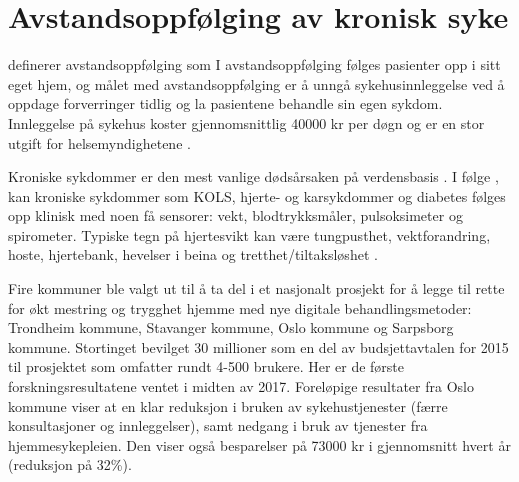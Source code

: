 \section{Avstandsoppfølging av kronisk syke}
\label{sec:remotemonitoring}
\citet{rojahn2016remote} definerer avstandsoppfølging som 
I avstandsoppfølging følges pasienter opp i sitt eget hjem, og
målet med avstandsoppfølging er å unngå sykehusinnleggelse ved å oppdage forverringer tidlig og la
pasientene behandle sin egen sykdom. Innleggelse på sykehus koster gjennomsnittlig 40000 kr per døgn og er en stor utgift
for helsemyndighetene \citep{regjeringen_innleggelse}.

Kroniske sykdommer er den mest vanlige dødsårsaken på verdensbasis \citep{who_chronic}.
I følge \citet{austad2016sensorer}, kan kroniske sykdommer som KOLS, hjerte- og karsykdommer og diabetes
følges opp klinisk med noen få sensorer: vekt, blodtrykksmåler, pulsoksimeter og spirometer. Typiske
tegn på hjertesvikt kan være tungpusthet, vektforandring, hoste, hjertebank, hevelser i beina og
tretthet/tiltaksløshet \citep{ehelse_hjertesvikt} \citep{nasjonalforeningen}.

Fire kommuner ble valgt ut til å ta del i et nasjonalt prosjekt for å legge til rette for økt mestring
og trygghet hjemme med nye digitale behandlingsmetoder: Trondheim kommune, Stavanger kommune, Oslo kommune og Sarpsborg kommune.
Stortinget bevilget 30 millioner som en del av budsjettavtalen for 2015 til prosjektet som omfatter rundt 4-500 brukere. %
Her er de første forskningsresultatene ventet i midten av 2017. Foreløpige resultater fra Oslo kommune viser at
en klar reduksjon i bruken av sykehustjenester (færre konsultasjoner og innleggelser), samt nedgang i bruk av
tjenester fra hjemmesykepleien. Den viser også besparelser på 73000 kr i gjennomsnitt hvert år (reduksjon på 32\%).


